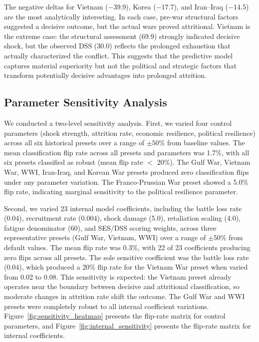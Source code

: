 The negative deltas for Vietnam ($-$39.9), Korea ($-$17.7), and Iran--Iraq ($-$14.5) are the most analytically interesting. In each case, pre-war structural factors suggested a decisive outcome, but the actual wars proved attritional. Vietnam is the extreme case: the structural assessment (69.9) strongly indicated decisive shock, but the observed DSS (30.0) reflects the prolonged exhaustion that actually characterized the conflict. This suggests that the predictive model captures material superiority but not the political and strategic factors that transform potentially decisive advantages into prolonged attrition.

\subsection{Parameter Sensitivity Analysis}

We conducted a two-level sensitivity analysis. First, we varied four control parameters (shock strength, attrition rate, economic resilience, political resilience) across all six historical presets over a range of $\pm 50\%$ from baseline values. The mean classification flip rate across all presets and parameters was 1.7\%, with all six presets classified as robust (mean flip rate $<$ 20\%). The Gulf War, Vietnam War, WWI, Iran-Iraq, and Korean War presets produced zero classification flips under any parameter variation. The Franco-Prussian War preset showed a 5.0\% flip rate, indicating marginal sensitivity to the political resilience parameter.

Second, we varied 23 internal model coefficients, including the battle loss rate (0.04), recruitment rate (0.004), shock damage (5.0), retaliation scaling (4.0), fatigue denominator (60), and SES/DSS scoring weights, across three representative presets (Gulf War, Vietnam, WWI) over a range of $\pm 50\%$ from default values. The mean flip rate was 0.3\%, with 22 of 23 coefficients producing zero flips across all presets. The sole sensitive coefficient was the battle loss rate (0.04), which produced a 20\% flip rate for the Vietnam War preset when varied from 0.02 to 0.08. This sensitivity is expected: the Vietnam preset already operates near the boundary between decisive and attritional classification, so moderate changes in attrition rate shift the outcome. The Gulf War and WWI presets were completely robust to all internal coefficient variations. Figure~\ref{fig:sensitivity_heatmap} presents the flip-rate matrix for control parameters, and Figure~\ref{fig:internal_sensitivity} presents the flip-rate matrix for internal coefficients.

